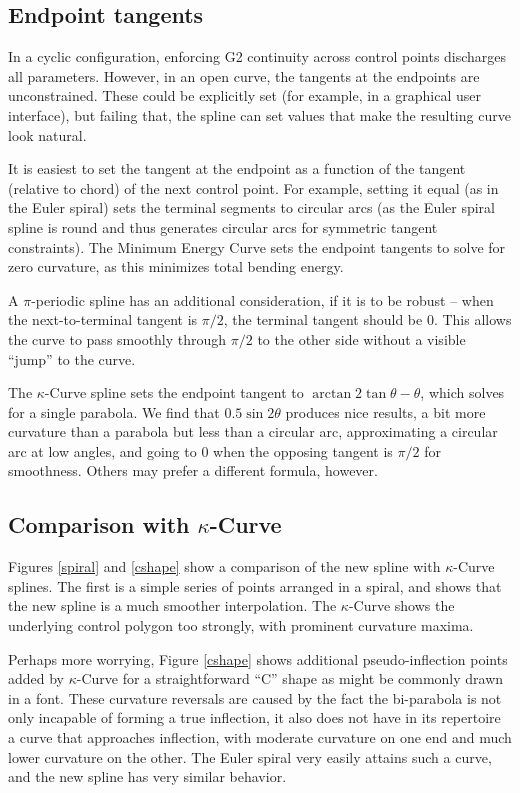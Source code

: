 \documentclass{article}
\newcommand{\kcurve}{$\kappa$-Curve}
\begin{document}
\subsection{Endpoint tangents}

In a cyclic configuration, enforcing G2 continuity across control points discharges all parameters. However, in an open curve, the tangents at the endpoints are unconstrained. These could be explicitly set (for example, in a graphical user interface), but failing that, the spline can set values that make the resulting curve look natural.

It is easiest to set the tangent at the endpoint as a function of the tangent (relative to chord) of the next control point. For example, setting it equal (as in the Euler spiral) sets the terminal segments to circular arcs (as the Euler spiral spline is round and thus generates circular arcs for symmetric tangent constraints). The Minimum Energy Curve sets the endpoint tangents to solve for zero curvature, as this minimizes total bending energy.

A $\pi$-periodic spline has an additional consideration, if it is to be robust -- when the next-to-terminal tangent is $\pi/2$, the terminal tangent should be $0$. This allows the curve to pass smoothly through $\pi/2$ to the other side without a visible ``jump'' to the curve.

The \kcurve{} spline sets the endpoint tangent to $\arctan{2\tan \theta} - \theta$, which solves for a single parabola. We find that $0.5\sin 2\theta$ produces nice results, a bit more curvature than a parabola but less than a circular arc, approximating a circular arc at low angles, and going to $0$ when the opposing tangent is $\pi/2$ for smoothness. Others may prefer a different formula, however.

\subsection{Comparison with \kcurve{}}

Figures \ref{spiral} and \ref{cshape} show a comparison of the new spline with \kcurve{} splines. The first is a simple series of points arranged in a spiral, and shows that the new spline is a much smoother interpolation. The \kcurve{} shows the underlying control polygon too strongly, with prominent curvature maxima.

Perhaps more worrying, Figure \ref{cshape} shows additional pseudo-inflection points added by \kcurve{} for a straightforward ``C'' shape as might be commonly drawn in a font. These curvature reversals are caused by the fact the bi-parabola is not only incapable of forming a true inflection, it also does not have in its repertoire a curve that approaches inflection, with moderate curvature on one end and much lower curvature on the other. The Euler spiral very easily attains such a curve, and the new spline has very similar behavior.
\end{document}
